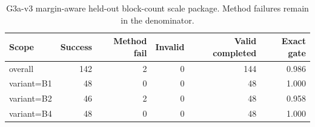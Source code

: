 \begin{table}[t]
\centering
\small
\begin{tabular}{lrrrrr}
\toprule
Scope & Success & Method fail & Invalid & Valid completed & Exact gate \\
\midrule
overall & 142 & 2 & 0 & 144 & 0.986 \\
variant=B1 & 48 & 0 & 0 & 48 & 1.000 \\
variant=B2 & 46 & 2 & 0 & 48 & 0.958 \\
variant=B4 & 48 & 0 & 0 & 48 & 1.000 \\
\bottomrule
\end{tabular}
\caption{G3a-v3 margin-aware held-out block-count scale package. Method failures remain in the denominator.}
\end{table}
